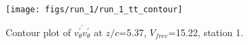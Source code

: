 \begin{figure}[H]
\centering
\texttt{[image: figs/run\_1/run\_1\_tt\_contour]}
\caption{Contour plot of $\overline{v_{\theta}^{\prime} v_{\theta}^{\prime}}$ at $z/c$=5.37, $V_{free}$=15.22, station 1.}
\label{fig:run_1_tt_contour}
\end{figure}


